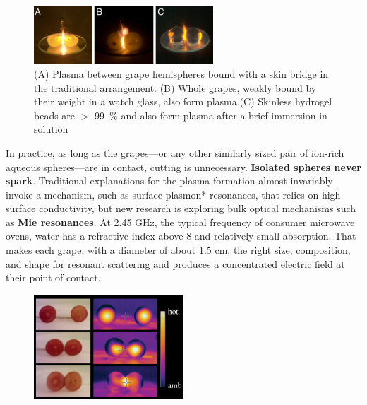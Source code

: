 \documentclass{article}
\begin{document}
\begin{figure}[h]
        \centering
        \includegraphics[width=0.6\textwidth]{Screenshot (504).png}
       \caption{ (A) Plasma between grape hemispheres bound with a skin bridge in the traditional arrangement. (B) Whole grapes, weakly bound by their weight in a watch glass, also form plasma.(C) Skinless hydrogel beads are $ > $  \SI{99}{\percent} and also form plasma after a brief immersion in  solution
       \cite{3} }
       
    \end{figure}
    In practice, as long as the grapes—or any other similarly sized pair of ion-rich aqueous spheres—are in contact, cutting is unnecessary. \cite{3} \textbf{Isolated spheres never spark}. Traditional explanations for the plasma formation almost invariably invoke a mechanism, such as surface plasmon* resonances, that relies on high surface conductivity, but new research is exploring bulk optical mechanisms such as \textbf{Mie resonances}. At 2.45 GHz, the typical frequency of consumer microwave ovens, water has a refractive index above 8 and relatively small absorption. That makes each grape, with a diameter of about 1.5 cm, the right size, composition, and shape for resonant scattering and produces a concentrated electric field at their point of contact.


\begin{figure}
        \centering
        \includegraphics[width=0.5\textwidth]{1-Figure2-1.png}
       
    \end{figure}
    
\end{document}
